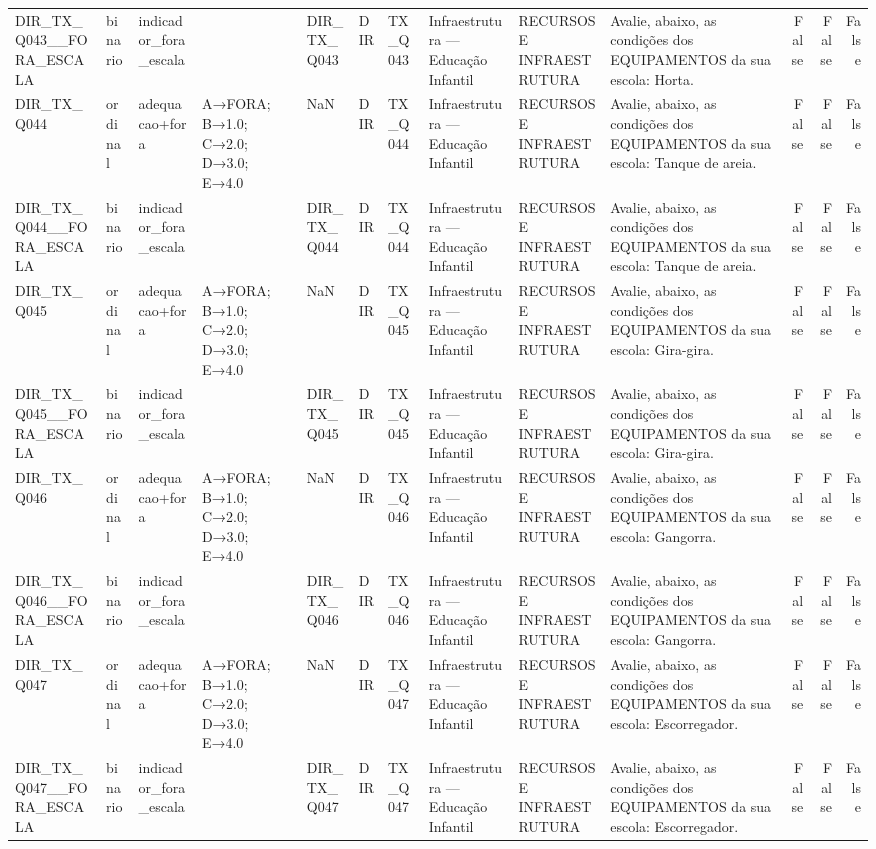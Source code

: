 \begin{tabular}{llllllllllrrr}
DIR\_TX\_Q043\_\_FORA\_ESCALA & binario & indicador\_fora\_escala &  & DIR\_TX\_Q043 & DIR & TX\_Q043 & Infraestrutura — Educação Infantil & RECURSOS E INFRAESTRUTURA & Avalie, abaixo, as condições dos EQUIPAMENTOS da sua escola: Horta. & False & False & False \\
DIR\_TX\_Q044 & ordinal & adequacao+fora & A→FORA; B→1.0; C→2.0; D→3.0; E→4.0 & NaN & DIR & TX\_Q044 & Infraestrutura — Educação Infantil & RECURSOS E INFRAESTRUTURA & Avalie, abaixo, as condições dos EQUIPAMENTOS da sua escola: Tanque de areia. & False & False & False \\
DIR\_TX\_Q044\_\_FORA\_ESCALA & binario & indicador\_fora\_escala &  & DIR\_TX\_Q044 & DIR & TX\_Q044 & Infraestrutura — Educação Infantil & RECURSOS E INFRAESTRUTURA & Avalie, abaixo, as condições dos EQUIPAMENTOS da sua escola: Tanque de areia. & False & False & False \\
DIR\_TX\_Q045 & ordinal & adequacao+fora & A→FORA; B→1.0; C→2.0; D→3.0; E→4.0 & NaN & DIR & TX\_Q045 & Infraestrutura — Educação Infantil & RECURSOS E INFRAESTRUTURA & Avalie, abaixo, as condições dos EQUIPAMENTOS da sua escola: Gira-gira. & False & False & False \\
DIR\_TX\_Q045\_\_FORA\_ESCALA & binario & indicador\_fora\_escala &  & DIR\_TX\_Q045 & DIR & TX\_Q045 & Infraestrutura — Educação Infantil & RECURSOS E INFRAESTRUTURA & Avalie, abaixo, as condições dos EQUIPAMENTOS da sua escola: Gira-gira. & False & False & False \\
DIR\_TX\_Q046 & ordinal & adequacao+fora & A→FORA; B→1.0; C→2.0; D→3.0; E→4.0 & NaN & DIR & TX\_Q046 & Infraestrutura — Educação Infantil & RECURSOS E INFRAESTRUTURA & Avalie, abaixo, as condições dos EQUIPAMENTOS da sua escola: Gangorra. & False & False & False \\
DIR\_TX\_Q046\_\_FORA\_ESCALA & binario & indicador\_fora\_escala &  & DIR\_TX\_Q046 & DIR & TX\_Q046 & Infraestrutura — Educação Infantil & RECURSOS E INFRAESTRUTURA & Avalie, abaixo, as condições dos EQUIPAMENTOS da sua escola: Gangorra. & False & False & False \\
DIR\_TX\_Q047 & ordinal & adequacao+fora & A→FORA; B→1.0; C→2.0; D→3.0; E→4.0 & NaN & DIR & TX\_Q047 & Infraestrutura — Educação Infantil & RECURSOS E INFRAESTRUTURA & Avalie, abaixo, as condições dos EQUIPAMENTOS da sua escola: Escorregador. & False & False & False \\
DIR\_TX\_Q047\_\_FORA\_ESCALA & binario & indicador\_fora\_escala &  & DIR\_TX\_Q047 & DIR & TX\_Q047 & Infraestrutura — Educação Infantil & RECURSOS E INFRAESTRUTURA & Avalie, abaixo, as condições dos EQUIPAMENTOS da sua escola: Escorregador. & False & False & False \\

\end{tabular}
